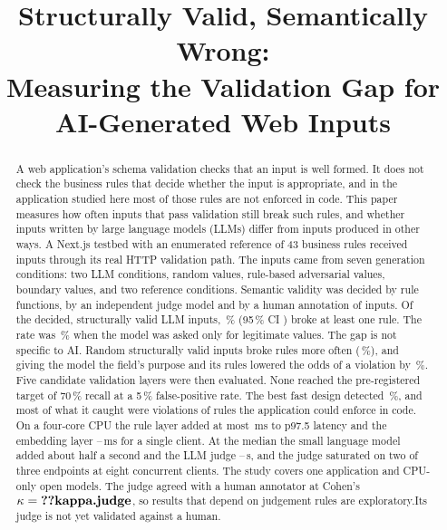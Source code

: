 \documentclass[conference]{IEEEtran}
\begin{document}
\title{Structurally Valid, Semantically Wrong:\\Measuring the Validation Gap for AI-Generated Web Inputs}

\author{
}

\maketitle

\begin{abstract}
A web application's schema validation checks that an input is well formed. It does not check the
business rules that decide whether the input is appropriate, and in the application studied here most
of those rules are not enforced in code. This paper measures how often inputs that pass validation still break such rules,
and whether inputs written by large language models (LLMs) differ from inputs produced in other ways.
A Next.js testbed with an enumerated reference of 43 business rules received  inputs
through its real HTTP validation path. The inputs came from seven generation conditions: two LLM
conditions, random values, rule-based adversarial values, boundary values, and two reference
conditions. Semantic validity was decided by rule functions, by an independent judge
model\ifhumanlabels{} and by a human annotation of  inputs\fi. Of the decided,
structurally valid LLM inputs, \,\% (95\,\% CI ) broke at least one rule. The rate
was \,\% when the model was asked only for legitimate values. The gap is not specific to
AI. Random structurally valid inputs broke rules more often (\,\%), and giving the model
the field's purpose and its rules lowered the odds of a violation by \,\%. Five
candidate validation layers were then evaluated. None reached the pre-registered target of 70\,\%
recall at a 5\,\% false-positive rate. The best fast design detected \,\%, and most
of what it caught were violations of rules the application could enforce in code. On a four-core CPU
the rule layer added at most \,ms to p97.5 latency and the embedding layer
--\,ms for a single client. At the median the small language
model added about half a second and the LLM judge
--\,s, and the judge saturated on two of three
endpoints at eight concurrent clients. The study covers one application and CPU-only open models.
\ifhumanlabels The judge agreed with a human annotator at Cohen's $\kappa=\R{kappa.judge}$\ifjudgeweak,
so results that depend on judgement rules are exploratory\fi.\else Its judge is not yet validated
against a human.\fi
\end{abstract}
\end{document}
